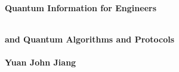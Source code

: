 %

\thispagestyle{empty}

\vspace{3cm}
  \begin{center}
	\bfseries \Huge Quantum Information for Engineers \par   %
        ~\\
	\bfseries \LARGE and Quantum Algorithms and Protocols \\   %
        ~\\
        \bfseries \Large Yuan John Jiang \par   %

        \vspace{3cm}
    
    \end{center}
    
\par

\newpage
